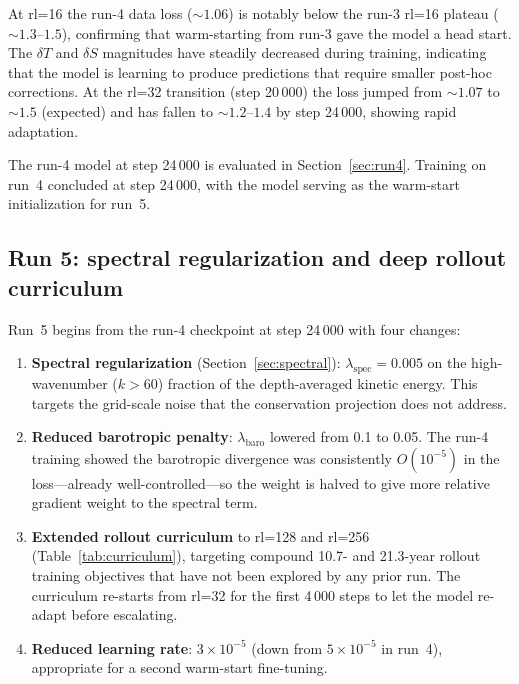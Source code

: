 \documentclass[11pt]{article}
\begin{document}
At rl=16 the run-4 data loss ($\sim1.06$) is notably below the run-3 rl=16 plateau
($\sim1.3$--$1.5$), confirming that warm-starting from run-3 gave the model a head start.
The $\delta T$ and $\delta S$ magnitudes have steadily decreased during training,
indicating that the model is learning to produce predictions that require smaller
post-hoc corrections. At the rl=32 transition (step 20\,000) the loss jumped
from $\sim1.07$ to $\sim1.5$ (expected) and has fallen to $\sim1.2$--$1.4$ by
step 24\,000, showing rapid adaptation.

The run-4 model at step 24\,000 is evaluated in Section~\ref{sec:run4}. Training
on run~4 concluded at step 24\,000, with the model serving as the warm-start
initialization for run~5.

\subsection{Run 5: spectral regularization and deep rollout curriculum}
\label{sec:run5train}

Run~5 begins from the run-4 checkpoint at step 24\,000 with four changes:
\begin{enumerate}[itemsep=2pt]
  \item \textbf{Spectral regularization} (Section~\ref{sec:spectral}):
    $\lambda_\text{spec}=0.005$ on the high-wavenumber ($k>60$) fraction of
    the depth-averaged kinetic energy. This targets the grid-scale noise that
    the conservation projection does not address.
  \item \textbf{Reduced barotropic penalty}: $\lambda_\text{baro}$ lowered from
    0.1 to 0.05. The run-4 training showed the barotropic divergence was
    consistently $O(10^{-5})$ in the loss---already well-controlled---so the
    weight is halved to give more relative gradient weight to the spectral term.
  \item \textbf{Extended rollout curriculum} to rl=128 and rl=256
    (Table~\ref{tab:curriculum}), targeting compound 10.7- and 21.3-year
    rollout training objectives that have not been explored by any prior run.
    The curriculum re-starts from rl=32 for the first 4\,000 steps to let the
    model re-adapt before escalating.
  \item \textbf{Reduced learning rate}: $3\times10^{-5}$ (down from
    $5\times10^{-5}$ in run~4), appropriate for a second warm-start fine-tuning.
\end{enumerate}
\end{document}
